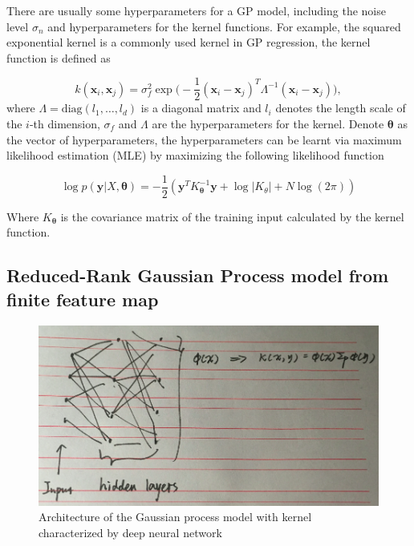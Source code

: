 There are usually some hyperparameters for a GP model, including the noise level $\sigma_n$ and hyperparameters for the kernel functions. For example, the squared exponential kernel is a commonly used kernel in GP regression, the kernel function is defined as

\begin{equation}
    \label{eq:GaussianCovarianceFunction}
    k(\bm{x}_i, \bm{x}_j) = \sigma_f^2 \exp\Big(-\frac{1}{2}(\bm{x}_i - \bm{x}_j)^T\Lambda^{-1}(\bm{x}_i - \bm{x}_j)\Big),
\end{equation}
where $\Lambda = \mathrm{diag}(l_1, \dots, l_d)$ is a diagonal matrix and $l_i$ denotes the length scale of the $i$-th dimension, $\sigma_f$ and $\Lambda$ are the hyperparameters for the kernel. Denote $\bm{\theta}$ as the vector of hyperparameters, the hyperparameters can be learnt via maximum likelihood estimation (MLE) by maximizing the following likelihood function

\begin{equation}
    \label{eq:GPloglikelihood}
    \log p(\bm{y} | X, \bm{\theta}) = -\frac{1}{2}(\bm{y}^T K_{\bm{\theta}}^{-1} \bm{y} + \log |K_{\theta}| + N \log(2 \pi))
\end{equation}

Where $K_{\bm{\theta}}$ is the covariance matrix of the training input calculated by the kernel function.

\subsection{Reduced-Rank Gaussian Process model from finite feature map}\label{sec:NNGP}

\begin{figure}[!htb]
    \centering
    \includegraphics[width=\columnwidth]{./img/NN-GP.png}
    \caption{Architecture of the Gaussian process model with kernel characterized by deep neural network}
    \label{fig:NNGP}
\end{figure}

